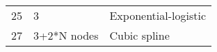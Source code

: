 \begin{center}
\begin{longtable}{p{2cm} p{3cm} p{10cm}}
		25 & 3 & Exponential-logistic \\
		27 & 3+2*N nodes & Cubic spline\\
		\hline
	\end{longtable}
\end{center}


